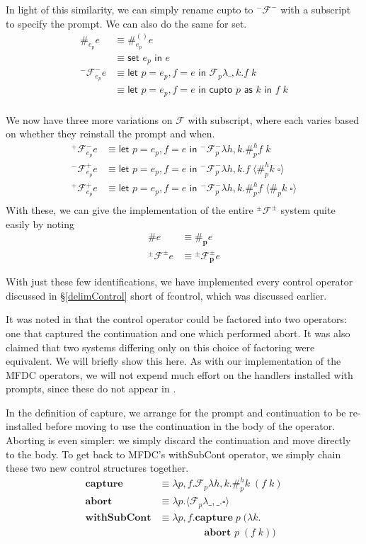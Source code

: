 \documentclass[11pt]{article}
\newcommand{\letin}[2]{\textsf{let }#1\textsf{ in }#2}
\newcommand\F{\mathcal{F}}
\newcommand\pmFpm{^\pm\F^\pm}
\newcommand{\angles}[1]{\langle#1\rangle}
\begin{document}
In light of this similarity, we can simply rename cupto to $^-\F^-$ with a subscript to specify the prompt.
We can also do the same for \textsf{set}.
\begin{align*}
\#_{e_p}e &\equiv \#_{e_p}^{()}e \\
	&\equiv \textsf{set }e_p\textsf{ in }e \\
^-\F^-_{e_p}e &\equiv
	\letin{p = e_p,f=e}{\F_{p}\lambda \_,k.f\;k} \\
	&\equiv \letin{p=e_p,f=e}{\textsf{cupto }p\textsf{ as }k\textsf{ in }f\;k} \\
\end{align*}

We now have three more variations on $\F$ with subscript, where each varies based on whether they reinstall the prompt and when.
\begin{align*}
^+\F^-_{e_p}e &\equiv
	\letin{p=e_p,f=e}{^-\F_{p}^-\lambda h,k.\#_{p}^hf\;k} \\
^-\F^+_{e_p}e &\equiv
	\letin{p=e_p,f=e}{^-\F_{p}^-\lambda h,k.f\;\angles{\#_{p}^hk\;\square}} \\
^+\F^+_{e_p}e &\equiv
	\letin{p=e_p,f=e}{^-\F_{p}^-\lambda h,k.\#_{p}^hf\;\angles{\#_{p}k\;\square}} \\
\end{align*}
With these, we can give the implementation of the entire $\pmFpm$ system quite easily by noting 
\begin{align*}
\#e &\equiv \#_\mathbf{p}e \\
\pmFpm e &\equiv{} \pmFpm_\mathbf{p}e
\end{align*}

With just these few identifications, we have implemented every control operator discussed in \S\ref{delimControl} short of fcontrol, which was discussed earlier.


It was noted in \cite{MFDC} that the control operator could be factored into two operators: one that captured the continuation and one which performed abort.
It was also claimed that two systems differing only on this choice of factoring were equivalent.
We will briefly show this here.
As with our implementation of the MFDC operators, we will not expend much effort on the handlers installed with prompts, since these do not appear in \cite{MFDC}.

In the definition of capture, we arrange for the prompt and continuation to be re-installed before moving to use the continuation in the body of the operator.
Aborting is even simpler: we simply discard the continuation and move directly to the body.
To get back to MFDC's \textsf{withSubCont} operator, we simply chain these two new control structures together.
\begin{align*}
\textbf{capture} &\equiv
	\lambda p,f.\F_p\lambda h,k.\#_p^hk\;(f\;k) \\
\textbf{abort } &\equiv
	\lambda p.\angles{\F_p\lambda \_,\_.\square} \\
\textbf{withSubCont} &\equiv
	\lambda p,f.\textbf{capture}\;p\;(\lambda k. \\
	&\qquad\qquad\;\;	\textbf{abort }p\;(f\;k)) \\
\end{align*}
\end{document}
